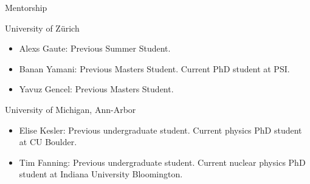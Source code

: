 \documentclass{resume} %
\begin{document}
\begin{rSection}{Mentorship}
\begin{rSubsection}{University of Zürich}{}{}{}
    \begin{itemize}
    \item Alexs Gaute: Previous Summer Student.
    \item Banan Yamani: Previous Masters Student. Current PhD student at \ac{PSI}.
    \item Yavuz Gencel: Previous Masters Student. 
    \end{itemize}
\end{rSubsection}

\begin{rSubsection}{University of Michigan, Ann-Arbor}{}{}{}
\begin{itemize}
    \item Elise Kesler: Previous undergraduate student. Current physics PhD student at CU Boulder.
    \item Tim Fanning: Previous undergraduate student. Current nuclear physics PhD student at Indiana University Bloomington.
\end{itemize}
\end{rSubsection}

\end{rSection}





%

\end{document}
